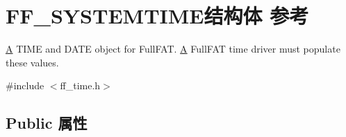 \hypertarget{struct_f_f___s_y_s_t_e_m_t_i_m_e}{}\section{F\+F\+\_\+\+S\+Y\+S\+T\+E\+M\+T\+I\+M\+E结构体 参考}
\label{struct_f_f___s_y_s_t_e_m_t_i_m_e}


\hyperlink{struct_a}{A} T\+I\+ME and D\+A\+TE object for Full\+F\+AT. \hyperlink{struct_a}{A} Full\+F\+AT time driver must populate these values.  




{\ttfamily \#include $<$ff\+\_\+time.\+h$>$}

\subsection*{Public 属性}
